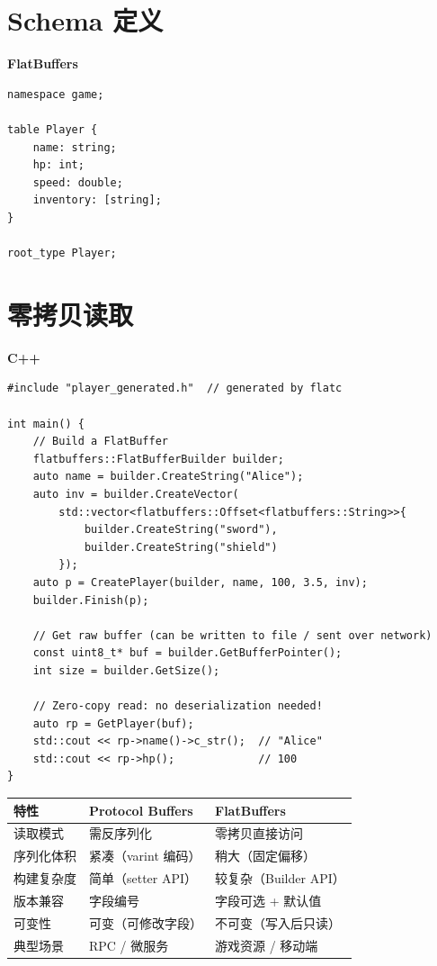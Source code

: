 \documentclass[12pt,a4paper,fontset=fandol]{ctexbook}
\newcommand{\cpplabel}{%
  \noindent\begin{tcolorbox}[colback=algheadbg,coltext=white,
    sharp corners,boxrule=0pt,width=3.0em,height=1.4em,
    halign=center,valign=center,nobeforeafter,left=0pt,right=0pt,
    top=0pt,bottom=0pt]\small\bfseries C++\end{tcolorbox}}
\newcommand{\flatbuflabel}{%
  \noindent\begin{tcolorbox}[colback=fbsheadbg,coltext=white,
    sharp corners,boxrule=0pt,width=5.9em,height=1.4em,
    halign=center,valign=center,nobeforeafter,left=0pt,right=0pt,
    top=0pt,bottom=0pt]\small\bfseries FlatBuffers\end{tcolorbox}}
\begin{document}
\section{Schema 定义}\label{sec:fbs-schema}

\flatbuflabel
\begin{lstlisting}[style=fbsstyle,caption={FlatBuffers: .fbs Schema 定义}]
namespace game;

table Player {
    name: string;
    hp: int;
    speed: double;
    inventory: [string];
}

root_type Player;
\end{lstlisting}

\section{零拷贝读取}\label{sec:fbs-zerocopy}

\cpplabel
\begin{lstlisting}[caption={FlatBuffers: 零拷贝读取}]
#include "player_generated.h"  // generated by flatc

int main() {
    // Build a FlatBuffer
    flatbuffers::FlatBufferBuilder builder;
    auto name = builder.CreateString("Alice");
    auto inv = builder.CreateVector(
        std::vector<flatbuffers::Offset<flatbuffers::String>>{
            builder.CreateString("sword"),
            builder.CreateString("shield")
        });
    auto p = CreatePlayer(builder, name, 100, 3.5, inv);
    builder.Finish(p);

    // Get raw buffer (can be written to file / sent over network)
    const uint8_t* buf = builder.GetBufferPointer();
    int size = builder.GetSize();

    // Zero-copy read: no deserialization needed!
    auto rp = GetPlayer(buf);
    std::cout << rp->name()->c_str();  // "Alice"
    std::cout << rp->hp();             // 100
}
\end{lstlisting}

\begin{compare}[title={Protobuf vs FlatBuffers}]
\begin{tabularx}{\textwidth}{lXX}
\toprule
\textbf{特性} & \textbf{Protocol Buffers} & \textbf{FlatBuffers} \\
\midrule
读取模式 & 需反序列化 & 零拷贝直接访问 \\
序列化体积 & 紧凑（varint 编码） & 稍大（固定偏移） \\
构建复杂度 & 简单（setter API） & 较复杂（Builder API） \\
版本兼容 & 字段编号 & 字段可选 + 默认值 \\
可变性 & 可变（可修改字段） & 不可变（写入后只读） \\
典型场景 & RPC / 微服务 & 游戏资源 / 移动端 \\
\bottomrule
\end{tabularx}
\end{compare}
\end{document}
